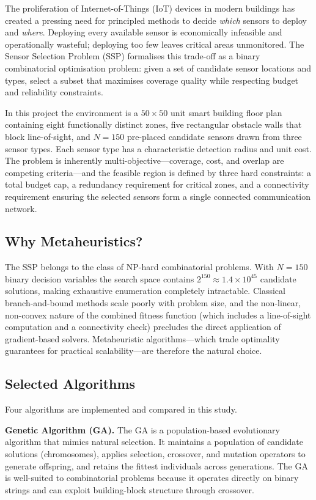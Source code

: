 \documentclass[12pt,a4paper]{article}
\begin{document}
The proliferation of Internet-of-Things (IoT) devices in modern buildings has created a pressing need for principled methods to decide \emph{which} sensors to deploy and \emph{where}.
Deploying every available sensor is economically infeasible and operationally wasteful; deploying too few leaves critical areas unmonitored.
The Sensor Selection Problem (SSP) formalises this trade-off as a binary combinatorial optimisation problem: given a set of candidate sensor locations and types, select a subset that maximises coverage quality while respecting budget and reliability constraints.

In this project the environment is a $50 \times 50$ unit smart building floor plan containing eight functionally distinct zones, five rectangular obstacle walls that block line-of-sight, and $N = 150$ pre-placed candidate sensors drawn from three sensor types.
Each sensor type has a characteristic detection radius and unit cost.
The problem is inherently multi-objective---coverage, cost, and overlap are competing criteria---and the feasible region is defined by three hard constraints: a total budget cap, a redundancy requirement for critical zones, and a connectivity requirement ensuring the selected sensors form a single connected communication network.

\subsection{Why Metaheuristics?}

The SSP belongs to the class of NP-hard combinatorial problems.
With $N = 150$ binary decision variables the search space contains $2^{150} \approx 1.4 \times 10^{45}$ candidate solutions, making exhaustive enumeration completely intractable.
Classical branch-and-bound methods scale poorly with problem size, and the non-linear, non-convex nature of the combined fitness function (which includes a line-of-sight computation and a connectivity check) precludes the direct application of gradient-based solvers.
Metaheuristic algorithms---which trade optimality guarantees for practical scalability---are therefore the natural choice.

\subsection{Selected Algorithms}

Four algorithms are implemented and compared in this study.

\textbf{Genetic Algorithm (GA).}
The GA is a population-based evolutionary algorithm that mimics natural selection.
It maintains a population of candidate solutions (chromosomes), applies selection, crossover, and mutation operators to generate offspring, and retains the fittest individuals across generations.
The GA is well-suited to combinatorial problems because it operates directly on binary strings and can exploit building-block structure through crossover.
\end{document}
